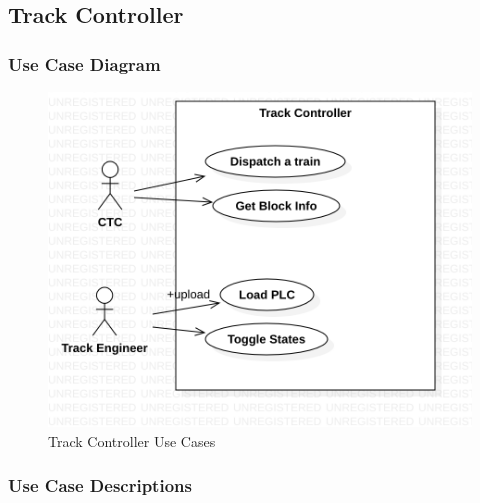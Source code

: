 \documentclass{article}
\begin{document}
    \paragraph{}

    \subsection{Track Controller}
    \subsubsection{Use Case Diagram}
    \begin{figure}[H]
        \centering
        \includegraphics[width=\textwidth]{./UseCaseDiagrams/TrackController_UseCaseDiagram.png}
        \caption{Track Controller Use Cases}
        \label{fig:Track Controller Use Cases}
    \end{figure}
    \subsubsection{Use Case Descriptions}
\end{document}

